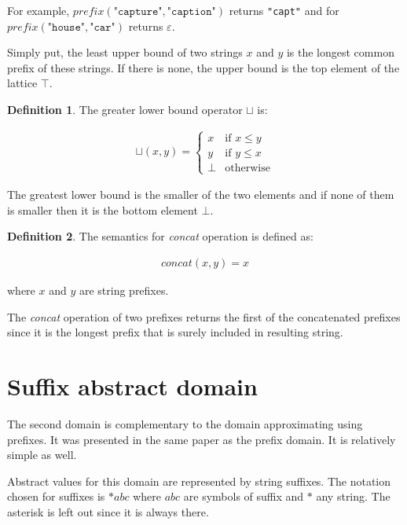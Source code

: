 \documentclass[12pt,final,oneside]{fithesis2}
\theoremstyle{definition}
\newtheorem{definition}{Definition}
\begin{document}
For example, $\textit{prefix}(\texttt{"capture"}, \texttt{"caption"})$ returns
\texttt{"capt"} and for $\textit{prefix}(\texttt{"house"}, \texttt{"car"})$
returns $\varepsilon$.

Simply put, the least upper bound of two strings $x$ and $y$
is the longest common prefix of these strings. If there is
none, the upper bound is the top element of the lattice $\top$.

\begin{definition}
\label{def:prefixmeet}
The greater lower bound operator $\sqcup$ is:

\begin{align*}
\sqcup (x, y) =
\begin{cases}
x    & \text{if } x \leq y \\
y    & \text{if } y \leq x \\
\bot & \text{otherwise}
\end{cases}
\end{align*}
\end{definition}

The greatest lower bound is the smaller of the two elements and if none
of them is smaller then it is the bottom element $\bot$.

\begin{definition}
\label{def:prefixstrcat}
The semantics for \textit{concat} operation is defined as:

\begin{align*}
\textit{concat}(x, y) = x
\end{align*}

where $x$ and $y$ are string prefixes.
\end{definition}

The \textit{concat} operation of two
prefixes returns the first of the concatenated prefixes since it is the
longest prefix that is surely included in resulting string.


\section{Suffix abstract domain}

The second domain is complementary to the domain approximating using
prefixes. It was presented in the same paper \cite{Constantini11-1} as the
prefix domain. It is relatively simple as well.

Abstract values for this domain are represented by string suffixes.
The notation chosen for suffixes is $*abc$ where $abc$ are symbols of
suffix and $*$ any string. The asterisk is left out since it is always
there.
\end{document}
